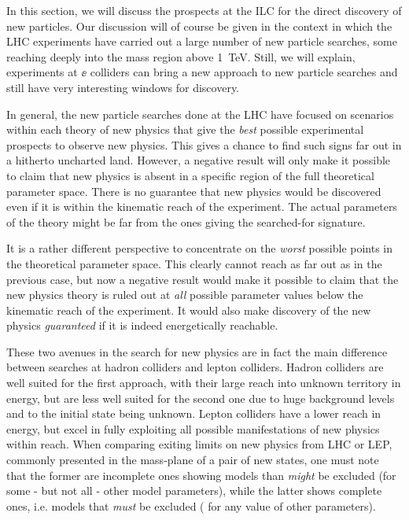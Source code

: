 In this section, we will discuss the prospects at the ILC for the
direct discovery of new particles.   Our discussion will of course be
given in the context in which the LHC experiments have carried out a
large number of new particle searches, some reaching deeply into the
mass region above 1~TeV.   Still, we will explain, experiments at
$\ee$ colliders can bring a new approach to new particle searches and
still have very interesting windows for discovery. 

In general, the new particle searches done at the LHC have focused on 
scenarios within each theory of new physics that give the 
{\it best} possible experimental prospects to observe new physics.
This gives a chance to find such signs far out in  a
hitherto uncharted land.
However,
a negative result will only make it possible to claim that 
new physics is absent in a specific region of the full theoretical 
parameter space.
There is  no guarantee that new physics would be discovered
even if it is within the kinematic reach of the experiment.
The actual parameters of the theory might be far from the
ones giving the searched-for signature.

It is a rather different perspective to concentrate on the 
{\it worst} possible
points in the theoretical parameter space.
This clearly cannot reach as far out as in the previous case,
but now  a negative result
would make it possible to claim that the new physics theory is
ruled out at {\it all} possible parameter values below the
kinematic reach of the experiment.
It would also make discovery of the new physics {\it guaranteed}
if it is indeed energetically reachable.

These two avenues in the search for new physics
are in fact the main difference between searches at
hadron colliders and lepton colliders.
Hadron colliders are well suited for the first approach,
with their large reach into unknown territory in
energy,
but are less well suited for the second one due to
huge background levels and to the initial state
being unknown.
Lepton colliders have a lower
reach in energy,
but excel in fully exploiting
all possible manifestations of new physics within
reach. 
When comparing exiting limits  on new physics from LHC or LEP,
commonly presented in the mass-plane
of a pair of new states,
one must note that the former are incomplete ones
showing
models than {\it might} be excluded (for some - but not all -
  other model parameters),
while the latter shows complete ones,
i.e. models that
{\it must} be excluded ( for any value of other parameters).

